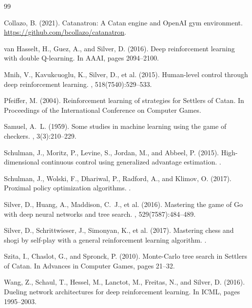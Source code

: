 \documentclass[11pt,a4paper]{article}
\begin{document}

\begin{thebibliography}{99}

Collazo, B. (2021).
\newblock Catanatron: A Catan engine and OpenAI gym environment.
\newblock \url{https://github.com/bcollazo/catanatron}.

van Hasselt, H., Guez, A., and Silver, D. (2016).
\newblock Deep reinforcement learning with double Q-learning.
\newblock In {AAAI}, pages 2094--2100.

Mnih, V., Kavukcuoglu, K., Silver, D., et al. (2015).
\newblock Human-level control through deep reinforcement learning.
, 518(7540):529--533.

Pfeiffer, M. (2004).
\newblock Reinforcement learning of strategies for Settlers of Catan.
\newblock In {Proceedings of the International Conference on Computer
Games}.

Samuel, A.~L. (1959).
\newblock Some studies in machine learning using the game of checkers.
, 3(3):210--229.

Schulman, J., Moritz, P., Levine, S., Jordan, M., and Abbeel, P. (2015).
\newblock High-dimensional continuous control using generalized advantage
estimation.
.

Schulman, J., Wolski, F., Dhariwal, P., Radford, A., and Klimov, O. (2017).
\newblock Proximal policy optimization algorithms.
.

Silver, D., Huang, A., Maddison, C.~J., et al. (2016).
\newblock Mastering the game of Go with deep neural networks and tree search.
, 529(7587):484--489.

Silver, D., Schrittwieser, J., Simonyan, K., et al. (2017).
\newblock Mastering chess and shogi by self-play with a general reinforcement
learning algorithm.
.

Szita, I., Chaslot, G., and Spronck, P. (2010).
\newblock Monte-Carlo tree search in Settlers of Catan.
\newblock In {Advances in Computer Games}, pages 21--32.

Wang, Z., Schaul, T., Hessel, M., Lanctot, M., Freitas, N., and Silver, D.
(2016).
\newblock Dueling network architectures for deep reinforcement learning.
\newblock In {ICML}, pages 1995--2003.

\end{thebibliography}
\end{document}
